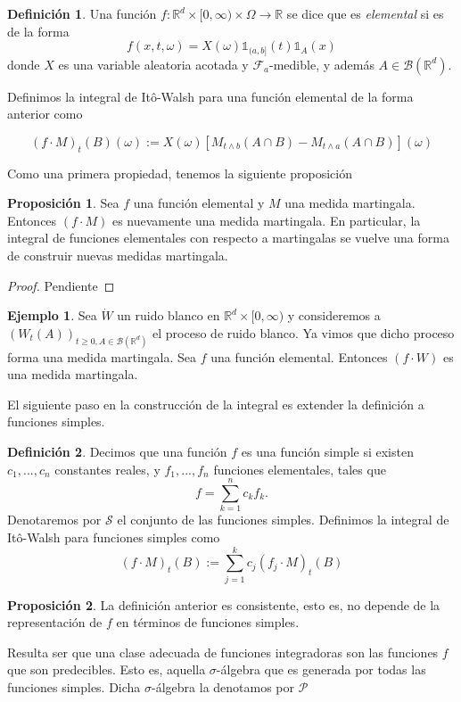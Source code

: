 \documentclass[letterpaper,twoside,12pt]{book}
\newcommand{\R}{\mathbb{R}}
\newcommand{\F}{\mathcal{F}}
\newcommand{\B}{\mathcal{B}}
\newcommand{\W}{\dot{W}}
\newcommand{\1}{\mathds{1}}
\renewcommand{\to}{\rightarrow}
\theoremstyle{definition}
\newtheorem{dfn}{Definición}
\theoremstyle{definition}
\theoremstyle{definition}
\theoremstyle{definition}
\newtheorem{prop}{Proposición}
\theoremstyle{definition}
\theoremstyle{definition}
\newtheorem{ejem}{Ejemplo}
\theoremstyle{definition}
\begin{document}
\begin{dfn} 
 Una función $f:\R^{d}\times [0,\infty)\times \Omega\to \R$ se dice que es \textit{elemental} si es de la forma 
 \[
    f(x,t,\omega)=X(\omega)\1_{(a,b]}(t)\1_A(x) 
 \]
 donde $X$ es una variable aleatoria acotada y $\F_a$-medible, y además $A\in \B(\R^{d})$. 
 
 Definimos la integral de Itô-Walsh para una función elemental de la forma anterior como 

 \[
 (f\cdot M)_t(B)(\omega):= X(\omega)\left[M_{t\wedge b}(A\cap B)-M_{t\wedge a}(A\cap B)\right](\omega)  
 \]
\end{dfn}

Como una primera propiedad, tenemos la siguiente proposición
\begin{prop} 
 Sea $f$ una función elemental y $M$ una medida martingala. Entonces $(f\cdot M)$ es nuevamente una medida martingala. En particular, la integral de funciones elementales con respecto a martingalas se vuelve una forma de construir nuevas medidas martingala.
 \end{prop}
\begin{proof} 
  Pendiente 
 \end{proof}
\begin{ejem} 
 Sea $\W$ un ruido blanco en $\R^{d}\times[0,\infty)$ y consideremos a $(W_t(A))_{t\geq0,A\in \B(\R^d)}$ el proceso de ruido blanco. Ya vimos que dicho proceso forma una medida martingala. Sea $f$ una función elemental. Entonces $(f\cdot W)$ es una medida martingala.
 \end{ejem}
 
 El siguiente paso en la construcción de la integral es extender la definición a funciones simples. 

 \begin{dfn} 
    Decimos que una función $f$ es una función simple si existen $c_1,...,c_n$ constantes reales, y $f_1,...,f_n$ funciones elementales, tales que 
    \[
      f=\sum_{k=1}^{n}c_kf_k.  
    \] Denotaremos por $\mathscr{S}$ el conjunto de las funciones simples. Definimos la integral de Itô-Walsh para funciones simples como 
    \[
    (f\cdot M)_t(B):=\sum_{j=1}^{k}c_j(f_j\cdot M)_t(B)    
    \]
  \end{dfn}
  \begin{prop} 
   La definición anterior es consistente, esto es, no depende de la representación de $f$ en términos de funciones simples.
   \end{prop}
Resulta ser que una clase adecuada de funciones integradoras son las funciones $f$ que son predecibles. Esto es, aquella $\sigma$-álgebra que es generada por todas las funciones simples. Dicha $\sigma$-álgebra la denotamos por $\mathscr{P}$
\end{document}
